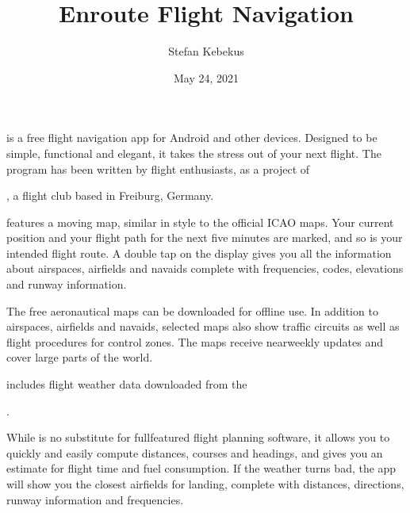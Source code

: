 \documentclass[letterpaper,10pt,english]{sphinxmanual}
\title{Enroute Flight Navigation}
\date{May 24, 2021}
\author{Stefan Kebekus}
\let\sphinxpxdimen\pdfpxdimen\else\newdimen\sphinxpxdimen
\begin{document}
\pagestyle{empty}
\sphinxmaketitle
\pagestyle{plain}
\sphinxtableofcontents
\pagestyle{normal}
\label{\detokenize{index::doc}}


\noindent{\hspace*{\fill}\sphinxincludegraphics[width=100\sphinxpxdimen]{{de.akaflieg_freiburg.enroute}.png}\hspace*{\fill}}

\sphinxAtStartPar
{} is a free flight navigation app for Android and
other devices.  Designed to be simple, functional and elegant, it takes the
stress out of your next flight. The program has been written by flight
enthusiasts, as a project of %
\begin{footnote}[1]\sphinxAtStartFootnote
{}
%
\end{footnote}, a flight club based in Freiburg, Germany.

\sphinxAtStartPar
{} features a moving map, similar in style to the
official ICAO maps. Your current position and your flight path for the next five
minutes are marked, and so is your intended flight route. A double tap on the
display gives you all the information about airspaces, airfields and navaids \textendash{}
complete with frequencies, codes, elevations and runway information.

\sphinxAtStartPar
The free aeronautical maps can be downloaded for offline use. In addition to
airspaces, airfields and navaids, selected maps also show traffic circuits as
well as flight procedures for control zones. The maps receive near\sphinxhyphen{}weekly
updates and cover large parts of the world.

\sphinxAtStartPar
{} includes flight weather data downloaded from the
%
\begin{footnote}[2]\sphinxAtStartFootnote
{}
%
\end{footnote}.

\sphinxAtStartPar
While  is no substitute for full\sphinxhyphen{}featured flight
planning software, it allows you to quickly and easily compute distances,
courses and headings, and gives you an estimate for flight time and fuel
consumption. If the weather turns bad, the app will show you the closest
airfields for landing, complete with distances, directions, runway information
and frequencies.
\end{document}
